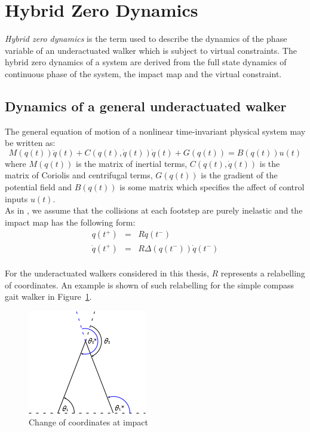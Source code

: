 \section{Hybrid Zero Dynamics}

\textit{Hybrid zero dynamics} is the term used to describe the dynamics of the phase variable of an underactuated walker which is subject to virtual constraints. The hybrid zero dynamics of a system are derived from the full state dynamics of continuous phase of the system, the impact map and the virtual constraint.

\subsection{Dynamics of a general underactuated walker}
The general equation of motion of a nonlinear time-invariant physical system may be written as:
\begin{equation}\label{eqn:dynamics}
	M\left(q(t)\right)\ddot{q}(t) + C\left(q(t),\dot{q}(t)\right)\dot{q}(t)
	 + G\left(q(t)\right) = B\left(q(t)\right)u(t)
\end{equation}
where $M\left(q(t)\right)$ is the matrix of inertial terms, $C\left(q(t),\dot{q}(t)\right)$ is the matrix of Coriolis and centrifugal terms, $G\left(q(t)\right)$ is the gradient of the potential field and $B\left(q(t)\right)$ is some matrix which specifies the affect of control inputs $u(t)$. \\

As in \cite{hurmuzlu1994rigid}, we assume that the collisions at each footstep are purely inelastic and the impact map has the following form:
\begin{eqnarray}
	q\left(t^+\right) &=& Rq\left(t^-\right) \\
	\dot{q}\left(t^+\right) &=& R\Delta\left(q\left(t^-\right)\right)\dot{q}\left(t^-\right)
\end{eqnarray} ~\\

For the underactuated walkers considered in this thesis, $R$ represents a relabelling of coordinates. An example is shown of such relabelling for the simple compass gait walker in Figure~\ref{fig:relabel}.

\begin{figure}[htp]
	\centering
	\includegraphics[scale=1]{../images/impact.png}
	\caption{Change of coordinates at impact}
	\label{fig:relabel}
\end{figure}

